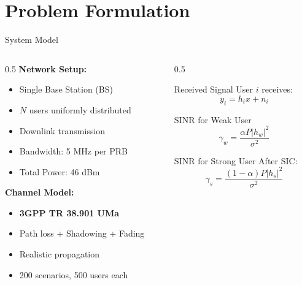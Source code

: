 \documentclass[aspectratio=169]{beamer}
\begin{document}
\section{Problem Formulation}

\begin{frame}{System Model}
    \begin{columns}
        \begin{column}{0.5\textwidth}
            \textbf{Network Setup:}
            \begin{itemize}
                \item Single Base Station (BS)
                \item $N$ users uniformly distributed
                \item Downlink transmission
                \item Bandwidth: 5 MHz per PRB
                \item Total Power: 46 dBm
            \end{itemize}
            
            \vspace{0.3cm}
            
            \textbf{Channel Model:}
            \begin{itemize}
                \item \textbf{3GPP TR 38.901 UMa}
                \item Path loss + Shadowing + Fading
                \item Realistic propagation
                \item 200 scenarios, 500 users each
            \end{itemize}
        \end{column}
        \begin{column}{0.5\textwidth}
            \begin{block}{Received Signal}
                User $i$ receives:
                \begin{equation*}
                    y_i = h_i x + n_i
                \end{equation*}
            \end{block}
            
            \begin{block}{SINR for Weak User}
                \begin{equation*}
                    \gamma_w = \frac{\alpha P |h_w|^2}{\sigma^2}
                \end{equation*}
            \end{block}
            
            \begin{block}{SINR for Strong User}
                After SIC:
                \begin{equation*}
                    \gamma_s = \frac{(1-\alpha) P |h_s|^2}{\sigma^2}
                \end{equation*}
            \end{block}
        \end{column}
    \end{columns}
\end{frame}
\end{document}
